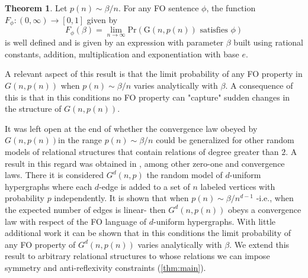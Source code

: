 \documentclass[12pt,notitlepage,a4paper]{article}
\theoremstyle{definition}
\newtheorem*{theorem*}{Theorem}
\newcommand{\Ln}{\lim\limits_{n\to \infty}}
\begin{document}
\begin{theorem*}
	Let $p(n)\sim \beta/n$. For any FO sentence $\phi$, the function
	$F_\phi: (0,\infty)\rightarrow [0,1]$ given by 
	\[ F_\phi(\beta) = \Ln \mathrm{Pr}\left( \mathrm{G}(n,p(n))
	\text{ satisfies } \phi   \right) \]
	is well defined and is given by an expression with parameter $\beta$ built
	using rational constants, addition, multiplication and exponentiation with base $e$.
\end{theorem*}

A relevant aspect of this result is that the limit probability of any FO
property in $G(n,p(n))$ when $p(n)\sim \beta/n$ varies analytically with $\beta$.
A consequence of this is that in this conditions no FO property can "capture" sudden changes 
in the structure of $G(n,p(n))$. \par
It was left open at the end of \cite{lynch1992probabilities} whether the convergence law obeyed
by $G(n,p(n))$in the range $p(n)\sim \beta/n$
could be generalized for other random models of relational structures 
that contain relations of degree greater than $2$.
A result in this regard was obtained in \cite{salvadorbrasil}, 
among other zero-one and convergence laws.
There it is considered $G^d(n,p)$ the random model of $d$-uniform hypergraphs where
each $d$-edge is added to a set of $n$ labeled vertices with probability $p$ independently.
It is shown that when $p(n)\sim \beta/n^{d-1}$ -i.e., when the expected number of
edges is linear- then $G^d(n,p(n))$ obeys a convergence law with respect of the FO
language of $d$-uniform hypergraphs. With little additional work it can be shown that
in this conditions the limit probability of any FO property of $G^d(n,p(n))$ varies 
analytically with $\beta$. We 
extend this result to arbitrary relational structures
to whose relations we can impose symmetry and anti-reflexivity constraints 
(\cref{thm:main}). \par
\end{document}
